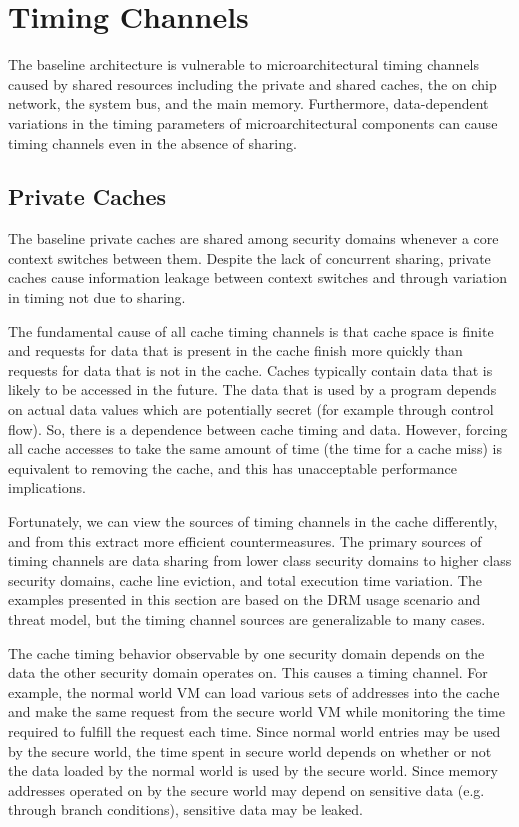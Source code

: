 \section{Timing Channels}
The baseline architecture is vulnerable to microarchitectural timing channels 
caused by shared resources including the private and shared caches, the on chip 
network, the system bus, and the main memory. Furthermore, data-dependent 
variations in the timing parameters of microarchitectural components can cause 
timing channels even in the absence of sharing.

\subsection{Private Caches}
The baseline private caches are shared among security domains whenever a core 
context switches between them. Despite the lack of concurrent sharing, private 
caches cause information leakage between context switches and through variation 
in timing not due to sharing. 

The fundamental cause of all cache timing channels is that cache space is 
finite and requests for data that is present in the cache finish more quickly 
than requests for data that is not in the cache. Caches typically contain data 
that is likely to be accessed in the future. The data that is used by a program 
depends on actual data values which are potentially secret (for example through 
control flow). So, there is a dependence between cache timing and data.  
However, forcing all cache accesses to take the same amount of time (the time 
for a cache miss) is equivalent to removing the cache, and this has 
unacceptable performance implications.

Fortunately, we can view the sources of timing channels in the cache 
differently, and from this extract more efficient countermeasures. The primary 
sources of timing channels are data sharing from lower class security domains 
to higher class security domains, cache line eviction, and total execution time 
variation. The examples presented in this section are based on the DRM usage 
scenario and threat model, but the timing channel sources are generalizable to 
many cases.

The cache timing behavior observable by one security domain depends on the data 
the other security domain operates on. This causes a timing channel. For 
example, the normal world VM can load various sets of addresses into the cache 
and make the same request from the secure world VM while monitoring the time 
required to fulfill the request each time.  Since normal world entries may be 
used by the secure world, the time spent in secure world depends on whether or 
not the data loaded by the normal world is used by the secure world.
Since memory addresses operated on by the secure world may depend on sensitive 
data (e.g. through branch conditions), sensitive data may be leaked. 

